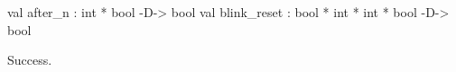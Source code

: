 \chklistingtrue
{}
\begin{ChkListingMsg}
val after_n : int * bool -D-> bool 
val blink_reset : bool * int * int * bool -D-> bool 
\end{ChkListingMsg}
\begin{ChkListingErr}
Success.
\end{ChkListingErr}
